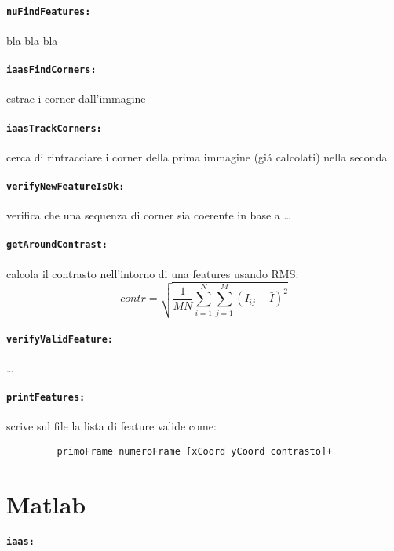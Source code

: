 \documentclass[12pt]{report}
\begin{document}
\paragraph*{\verb_nuFindFeatures:_} bla bla bla

\paragraph*{\verb_iaasFindCorners:_} estrae i corner dall'immagine

\paragraph*{\verb_iaasTrackCorners:_} cerca di rintracciare i corner della prima immagine (gi\'a calcolati) nella seconda

\paragraph*{\verb_verifyNewFeatureIsOk:_} verifica che una sequenza di corner sia coerente in base a \dots

\paragraph*{\verb_getAroundContrast:_} calcola il contrasto nell'intorno di una features usando RMS: $$contr = \sqrt{\frac{1}{MN}\sum_{i=1}^N\sum_{j=1}^M(I_{ij}-\bar{I})^2}$$

\paragraph*{\verb_verifyValidFeature:_} \dots


\paragraph*{\verb_printFeatures:_} scrive sul file la lista di feature valide come:
\begin{verbatim}
	     primoFrame numeroFrame [xCoord yCoord contrasto]+
\end{verbatim}

\section{Matlab}

\paragraph*{\verb_iaas:_}
\end{document}
